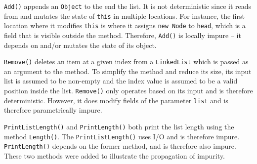 \documentclass[a4paper,12pt]{article}
\begin{document}
\texttt{Add()} appends an \texttt{Object} to the end the list. It is not deterministic since it reads from and mutates the state of \texttt{this} in multiple locations. For instance, the first location where it modifies \texttt{this} is where it assigns \texttt{new Node} to \texttt{head}, which is a field that is visible outside the method. Therefore, \texttt{Add()} is locally impure -- it depends on and/or mutates the state of its object.

\texttt{Remove()} deletes an item at a given index from a \texttt{LinkedList} which is passed as an argument to the method. To simplify the method and reduce its size, its input list is assumed to be non-empty and the index value is assumed to be a valid position inside the list. \texttt{Remove()} only operates based on its input and is therefore deterministic. However, it does modify fields of the parameter \texttt{list} and is therefore parametrically impure.

\texttt{PrintListLength()} and \texttt{PrintLength()} both print the list length using the method \texttt{Length()}. The \texttt{PrintListLength()} uses I/O and is therefore impure. \texttt{PrintLength()} depends on the former method, and is therefore also impure. These two methods were added to illustrate the propagation of impurity.
\end{document}
